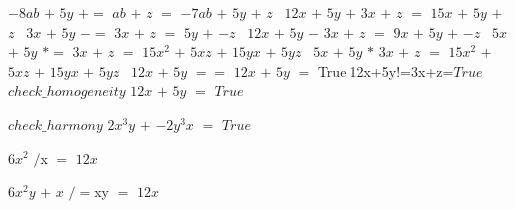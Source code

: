 \documentclass{\SetClass}
\begin{document}
$-8ab$ $+$ $5y$ $+=$ $ab$ $+$ $z$ $=$ $-7ab$ $+$ $5y$ $+$ $z$
\
$12x$ $+$ $5y$ $+$ $3x$ $+$ $z$ $=$ $15x$ $+$ $5y$ $+$ $z$
\
$3x$ $+$ $5y$ $-=$ $3x$ $+$ $z$ $=$ $5y$ $+$ $-z$
\
$12x$ $+$ $5y$ $-$ $3x$ $+$ $z$ $=$ $9x$ $+$ $5y$ $+$ $-z$
\
$5x$ $+$ $5y$ $*=$ $3x$ $+$ $z$ $=$ $15x^2$ $+$ $5xz$ $+$ $15yx$ $+$ $5yz$
\
$5x$ $+$ $5y$ $*$ $3x$ $+$ $z$ $=$ $15x^2$ $+$ $5xz$ $+$ $15yx$ $+$ $5yz$
\
$12x$ $+$ $5y$ $==$ $12x$ $+$ $5y$ $=$ True$
\
$12x$ $+$ $5y$ $!=$ $3x$ $+$ $z$ $=$ True$
\
$check\_homogeneity$ $12x$ $+$ $5y$ $=$ $True$
\par
$check\_harmony$ $2x^3y$ $+$ $-2y^3x$ $=$ $True$
\par
$6x^2$ $/$x $=$ $12x$
\par
$6x^2y$ $+$ $x$ $/=$xy $=$ $12x$
\par
\end{document}
